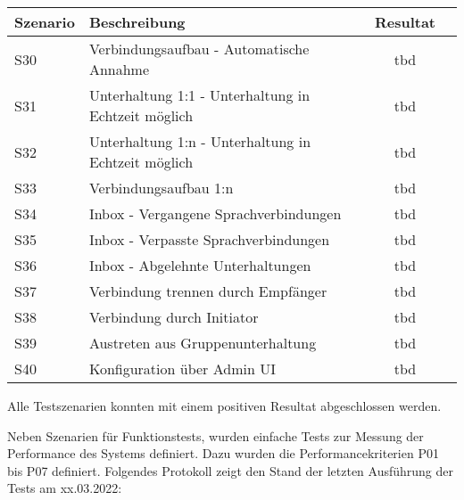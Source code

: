 \begin{table}[h]
    \centering
    \begin{tabular}{|l|p{11cm}|c|c|}
        \hline
        \textbf{Szenario} & \textbf{Beschreibung} & \textbf{Resultat} \\
        \hline
        S30         & Verbindungsaufbau - Automatische Annahme & tbd\\
        \hline
        S31         & Unterhaltung 1:1 - Unterhaltung in Echtzeit möglich & tbd\\
        \hline
        S32         & Unterhaltung 1:n - Unterhaltung in Echtzeit möglich & tbd\\
        \hline
        S33         & Verbindungsaufbau 1:n & tbd\\
        \hline
        S34         & Inbox - Vergangene Sprachverbindungen & tbd\\
        \hline
        S35         & Inbox - Verpasste Sprachverbindungen & tbd\\
        \hline
        S36         & Inbox - Abgelehnte Unterhaltungen & tbd\\
        \hline
        S37         & Verbindung trennen durch Empfänger & tbd\\
        \hline
        S38         & Verbindung durch Initiator & tbd\\
        \hline
        S39         & Austreten aus Gruppenunterhaltung & tbd\\
        \hline
        S40         & Konfiguration über Admin UI & tbd\\
        \hline
    \end{tabular}\label{tab:funktion_testplan_2}
\end{table}

Alle Testszenarien konnten mit einem positiven Resultat abgeschlossen werden.

Neben Szenarien für Funktionstests, wurden einfache Tests zur Messung der Performance des Systems definiert.
Dazu wurden die Performancekriterien P01 bis P07 definiert.
Folgendes Protokoll zeigt den Stand der letzten Ausführung der Tests am xx.03.2022:

